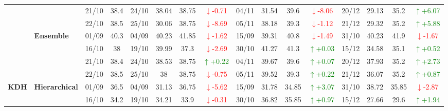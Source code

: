 \documentclass{ieeeaccess}
\begin{document}
{\begin{longtable}{llcc|cccc|cccc|cccc}
& 
& 21/10 & 38.4 & 24/10 & 38.04 & 38.75 & \textcolor{red}{\(\downarrow\)-0.71} & 04/11 & 31.54 & 39.6 & \textcolor{red}{\(\downarrow\)-8.06} & 20/12 & 29.13 & 35.2 & \textcolor{green}{\(\uparrow\)+6.07} \\

&
& 22/10 & 38.5 & 25/10 & 30.06 & 38.75 & \textcolor{red}{\(\downarrow\)-8.69} & 05/11 & 38.18 & 39.3 & \textcolor{red}{\(\downarrow\)-1.12} & 21/12 & 29.32 & 35.2 & \textcolor{green}{\(\uparrow\)+5.88} \\
\cmidrule(lr){2-16}


& \textbf{Ensemble}
& 01/09 & 40.3 & 04/09 & 40.23 & 41.85 & \textcolor{red}{\(\downarrow\)-1.62} & 15/09 & 39.31 & 40.8 & \textcolor{red}{\(\downarrow\)-1.49} & 31/10 & 40.23 & 41.9 & \textcolor{red}{\(\downarrow\)-1.67} \\

& 
& 16/10 & 38 & 19/10 & 39.99 & 37.3 & \textcolor{red}{\(\downarrow\)-2.69} & 30/10 & 41.27 & 41.3 & \textcolor{green}{\(\uparrow\)+0.03} & 15/12 & 34.58 & 35.1 & \textcolor{green}{\(\uparrow\)+0.52} \\

& 
& 21/10 & 38.4 & 24/10 & 38.53 & 38.75 & \textcolor{green}{\(\uparrow\)+0.22} & 04/11 & 39.67 & 39.6 & \textcolor{green}{\(\uparrow\)+0.07} & 20/12 & 37.93 & 35.2 & \textcolor{green}{\(\uparrow\)+2.73} \\

&
& 22/10 & 38.5 & 25/10 & 38 & 38.75 & \textcolor{red}{\(\downarrow\)-0.75} & 05/11 & 39.52 & 39.3 & \textcolor{green}{\(\uparrow\)+0.22} & 21/12 & 36.07 & 35.2 & \textcolor{green}{\(\uparrow\)+0.87} \\
\midrule



\multirow{12}{*}{\textbf{KDH}} 
& \textbf{Hierarchical}
& 01/09 & 36.5 & 04/09 & 31.13 & 36.75 & \textcolor{red}{\(\downarrow\)-5.62} & 15/09 & 31.78 & 34.85 & \textcolor{green}{\(\uparrow\)+3.07} & 31/10 & 38.72 & 35.85 & \textcolor{red}{\(\downarrow\)-2.87} \\

&
& 16/10 & 34.2 & 19/10 & 34.21 & 33.9 & \textcolor{red}{\(\downarrow\)-0.31} & 30/10 & 36.82 & 35.85 & \textcolor{green}{\(\uparrow\)+0.97} & 15/12 & 27.66 & 29.6 & \textcolor{green}{\(\uparrow\)+1.94} \\


\end{longtable}}
\end{document}
